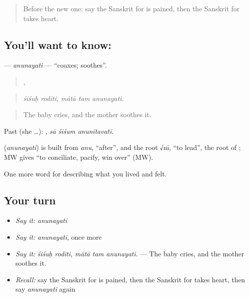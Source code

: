 \label{lesson:SA-C451-anunayati}



\begin{quote}
Before the new one: say the Sanskrit for is pained, then the Sanskrit for takes heart.
\end{quote}

\subsection*{You'll want to know: }
\textbf{} — \emph{anunayati} — \textquotedblleft{}coaxes; soothes\textquotedblright{}.

\begin{quote}
 ,   
\end{quote}

\begin{quote}
\emph{śiśuḥ roditi, mātā tam anunayati.}
\end{quote}

\begin{quote}
The baby cries, and the mother soothes it.
\end{quote}

Past (she …):   , \emph{sā śiśum anunītavatī}.

\begin{cousinweb}
\textbf{} (\emph{anunayati}) is built from \emph{anu}, \textquotedblleft{}after\textquotedblright{}, and the root √nī, \textquotedblleft{}to lead\textquotedblright{}, the root of \textbf{}; MW gives \textquotedblleft{}to conciliate, pacify, win over\textquotedblright{} (MW).
\end{cousinweb}

\begin{grammarlens}[title={What you've built}]
One more word for describing what you lived and felt.
\end{grammarlens}

\subsection*{Your turn}
\begin{itemize}
\raggedright
  \item \emph{Say it:} \emph{anunayati}
  \item \emph{Say it:} \emph{anunayati}, once more
  \item \emph{Say it:} \emph{śiśuḥ roditi, mātā tam anunayati.} — The baby cries, and the mother soothes it.
  \item \emph{Recall:} say the Sanskrit for is pained, then the Sanskrit for takes heart, then say \emph{anunayati} again
\end{itemize}

